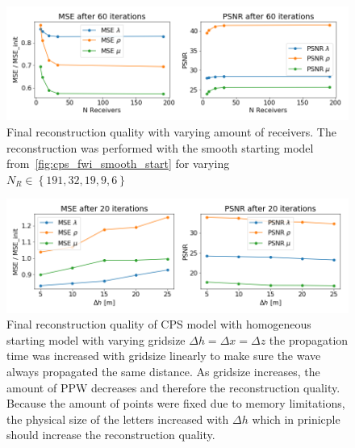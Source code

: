 \documentclass[10pt]{SelfArx} %
\theoremstyle{definition}
\begin{document}
\begin{figure}[!h]\label{fig:cps_n_receiver_comparison}
\hspace*{-0.4in}
\includegraphics[width=1.15\textwidth]{fig/fwi_vs_n_receivers.png}
\caption{Final reconstruction quality with varying amount of receivers. The reconstruction was performed with the smooth starting model from~\cref{fig:cps_fwi_smooth_start} for varying $N_R \in \left\{191,32,19,9,6\right\}$}
\end{figure}

\begin{figure}[!h]\label{fig:cps_gridsize_comparison}
\hspace*{-0.4in}
\includegraphics[width=1.15\textwidth]{fig/fwi_vs_gridsize.png}
\caption{Final reconstruction quality of CPS model with homogeneous starting model with varying gridsize $\Delta h = \Delta x = \Delta z$ the propagation time was increased with gridsize linearly to make sure the wave always propagated the same distance. As gridsize increases, the amount of PPW decreases and therefore the reconstruction quality. Because the amount of points were fixed due to memory limitations, the physical size of the letters increased with $\Delta h$ which in prinicple should increase the reconstruction quality.}
\end{figure}
\clearpage
\end{document}
